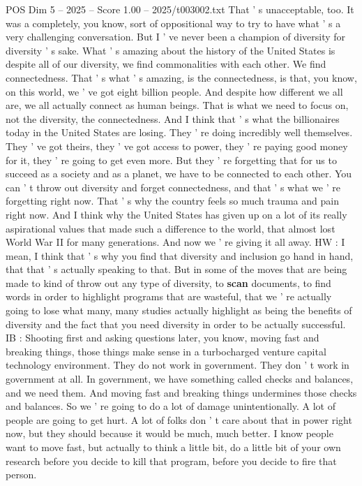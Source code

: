 \begin{textsample}{POS Dim 5 – 2025 – Score 1.00 – 2025/t003002.txt}
That ' s unacceptable, too.
It was a completely, you know, sort of oppositional way to try to have what ' s a very challenging conversation.
But I ' ve never been a champion of diversity for diversity ' s sake.
What ' s amazing about the history of the United States is despite all of our diversity, we find commonalities with each other.
We find connectedness.
That ' s what ' s amazing, is the connectedness, is that, you know, on this world, we ' ve got eight billion people.
And despite how different we all are, we all actually connect as human beings.
That is what we need to focus on, not the diversity, the connectedness.
And I think that ' s what the billionaires today in the United States are losing.
They ' re doing incredibly well themselves.
They ' ve got theirs, they ' ve got access to power, they ' re paying good money for it, they ' re going to get even more.
But they ' re forgetting that for us to succeed as a society and as a planet, we have to be connected to each other.
You can ' t throw out diversity and forget connectedness, and that ' s what we ' re forgetting right now.
That ' s why the country feels so much trauma and pain right now.
And I think why the United States has given up on a lot of its really aspirational values that made such a difference to the world, that almost lost World War II for many generations.
And now we ' re giving it all away.
HW : I mean, I think that ' s why you find that diversity and inclusion go hand in hand, that that ' s actually speaking to that.
But in some of the moves that are being made to kind of throw out any type of diversity, to \textbf{scan} documents, to find words in order to highlight programs that are wasteful, that we ' re actually going to lose what many, many studies actually highlight as being the benefits of diversity and the fact that you need diversity in order to be actually successful.
IB : Shooting first and asking questions later, you know, moving fast and breaking things, those things make sense in a turbocharged venture capital technology environment.
They do not work in government.
They don ' t work in government at all.
In government, we have something called checks and balances, and we need them.
And moving fast and breaking things undermines those checks and balances.
So we ' re going to do a lot of damage unintentionally.
A lot of people are going to get hurt.
A lot of folks don ' t care about that in power right now, but they should because it would be much, much better.
I know people want to move fast, but actually to think a little bit, do a little bit of your own research before you decide to kill that program, before you decide to fire that person.

\end{textsample}
